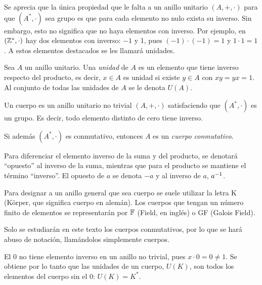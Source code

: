 Se aprecia que la única propiedad que le falta a un anillo unitario $(A, +, \cdot)$ para que $(A^*, \cdot)$ sea grupo es que para cada elemento no nulo exista su inverso. Sin embargo, esto no significa que no haya elementos con inverso. Por ejemplo, en $(\mathbb{Z}^*,\cdot)$ hay dos elementos con inverso: $-1$ y 1, pues $(-1) \cdot (-1) = 1 $ y $1 \cdot 1 = 1$. A estos elementos destacados se les llamará unidades.

\begin{deff}{\cite[p.~20]{GamboaAnillos}}
    Sea $A$ un anillo unitario. Una \textit{unidad} de $A$ es un elemento que tiene inverso respecto del producto, es decir, $x\in A$ es unidad si existe $y\in A$ con $xy = yx = 1$. Al conjunto de todas las unidades de $A$ se le denota $U(A)$.
\end{deff}

\begin{deff}[Cuerpo]{\cite[p.~20]{GamboaAnillos}}
    Un cuerpo es un anillo unitario no trivial $(A,+,\cdot)$ satisfaciendo que $(A^*,\cdot)$ es un grupo. Es decir, todo elemento distinto de cero tiene inverso.
    \item Si además $(A^*,\cdot)$ es conmutativo, entonces $A$ es un \textit{cuerpo conmutativo}.
    
\end{deff}

\begin{nott}
        \item Para diferenciar el elemento inverso de la suma y del producto, se denotará ``opuesto'' al inverso de la suma, mientras que para el producto se mantiene el término ``inverso''. El opuesto de $a$ se denota $-a$ y al inverso de $a$, $a^{-1}$.
        \item Para designar a un anillo general que sea cuerpo se suele utilizar la letra K (Körper, que significa cuerpo en alemán). Los cuerpos que tengan un número finito de elementos se representarán por $\mathbb{F}$ (Field, en inglés) o GF (Galois Field).
        \item Solo se estudiarán en este texto los cuerpos conmutativos, por lo que se hará abuso de notación, llamándolos simplemente cuerpos.
  \end{nott}

\begin{obs}
    El 0 no tiene elemento inverso en un anillo no trivial, pues $x\cdot 0 = 0 \neq 1$. Se obtiene por lo tanto que las unidades de un cuerpo, $U(K)$, son todos los elementos del cuerpo sin el 0: $U(K) = K^*$.
\end{obs}



